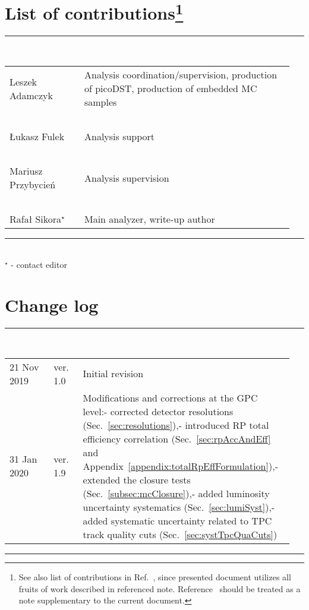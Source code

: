 \section*{\LARGE List of contributions\footnote{See also list of contributions in Ref.~\cite{supplementaryNote}, since presented document utilizes all fruits of work described in referenced note. Reference~\cite{supplementaryNote} should be treated as a note supplementary to the current document.}}%
%
   \rule{\textwidth}{1.0pt}\\[5pt]%
      \begin{tabular}{>{\raggedright}p{0.25\linewidth}p{0.7\linewidth}}
		Leszek Adamczyk & Analysis coordination/supervision, production of picoDST, production of embedded MC samples\\
		~&~\\
		Łukasz Fulek & Analysis support\\
		~&~\\
		Mariusz Przybycień & Analysis supervision\\
		~&~\\
        Rafał Sikora$^{\star}$  & Main analyzer, write-up author\\
      \end{tabular}\newline
   \rule{\textwidth}{1.0pt}\\[10pt]%
   $^{\star}$ - contact editor
   \\[50pt]%
\section*{\LARGE Change log}%
%
  \rule{\textwidth}{1.0pt}\\[5pt]%
  \begin{tabular}{>{\raggedright}p{0.15\linewidth}p{0.1\linewidth}p{0.7\linewidth}}
  	21 Nov 2019 & ver. 1.0 & Initial revision\\
  	31 Jan 2020 & ver. 1.9 & Modifications and corrections at the GPC level:\newline- corrected detector resolutions (Sec.~\ref{sec:resolutions}),\newline- introduced RP total efficiency correlation (Sec.~\ref{sec:rpAccAndEff} and Appendix~\ref{appendix:totalRpEffFormulation}),\newline- extended the closure tests (Sec.~\ref{subsec:mcClosure}),\newline- added luminosity uncertainty systematics (Sec.~\ref{sec:lumiSyst}),\newline- added systematic uncertainty related to TPC track quality cuts (Sec.~\ref{sec:systTpcQuaCuts})
  \end{tabular}\newline%
 \rule{\textwidth}{1.0pt}
